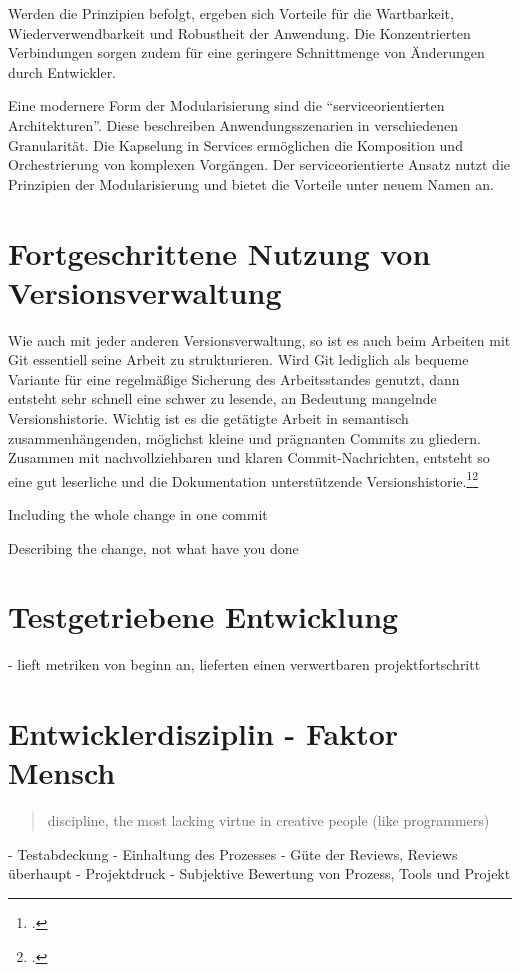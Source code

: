 Werden die Prinzipien befolgt, ergeben sich Vorteile für die Wartbarkeit, Wiederverwendbarkeit und Robustheit der Anwendung. Die Konzentrierten Verbindungen sorgen zudem für eine geringere Schnittmenge von Änderungen durch Entwickler.

Eine modernere Form der Modularisierung sind die ``serviceorientierten Architekturen''. Diese beschreiben Anwendungsszenarien in verschiedenen Granularität. Die Kapselung in Services ermöglichen die Komposition und Orchestrierung von komplexen Vorgängen. Der serviceorientierte Ansatz nutzt die Prinzipien der Modularisierung und bietet die Vorteile unter neuem Namen an.

\section{Fortgeschrittene Nutzung von Versionsverwaltung}



Wie auch mit jeder anderen Versionsverwaltung, so ist es auch beim Arbeiten mit Git essentiell seine Arbeit zu strukturieren. Wird Git lediglich als bequeme Variante für eine regelmäßige Sicherung des Arbeitsstandes genutzt, dann entsteht sehr schnell eine schwer zu lesende, an Bedeutung mangelnde Versionshistorie. Wichtig ist es die getätigte Arbeit in semantisch zusammenhängenden, möglichst kleine und prägnanten Commits zu gliedern.
Zusammen mit nachvollziehbaren und klaren Commit-Nachrichten, entsteht so eine gut leserliche und die Dokumentation unterstützende Versionshistorie.\footcite[Making only one change per commit][]{git-essentials-2017}\footcite[Writing commit messages before starting to code][]{git-essentials-2017}

Including the whole change in one commit

Describing the change, not what have you done

\section{Testgetriebene Entwicklung}
- lieft metriken von beginn an, lieferten einen verwertbaren projektfortschritt


\section{Entwicklerdisziplin - Faktor Mensch}
\label{sec:human-fail}
\blockquote {discipline, the most lacking virtue in creative people (like programmers)}
- Testabdeckung
- Einhaltung des Prozesses
- Güte der Reviews, Reviews überhaupt
- Projektdruck
- Subjektive Bewertung von Prozess, Tools und Projekt

